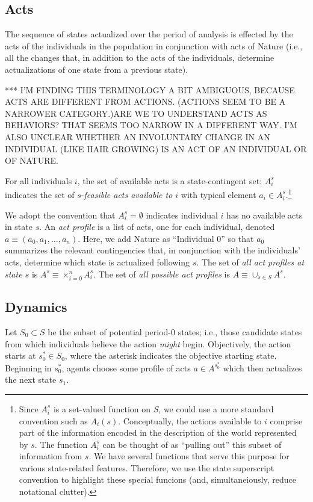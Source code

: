 \documentclass[
11pt,
titlepage,
reqno,
]{article}%
\theoremstyle{definition}
\begin{document}
	
	
	\subsection{Acts\label{sec:dynamics}}
	The sequence of states actualized over the period of analysis is effected by the acts of the individuals in the population in conjunction with acts of Nature (i.e., all the changes that, in addition to the acts of the individuals, determine actualizations of one state from a previous state). 
	
	*** I'M FINDING THIS TERMINOLOGY A BIT AMBIGUOUS, BECAUSE ACTS ARE DIFFERENT FROM ACTIONS. (ACTIONS SEEM TO BE A NARROWER CATEGORY.)ARE WE TO UNDERSTAND ACTS AS BEHAVIORS? THAT SEEMS TOO NARROW IN A DIFFERENT WAY. I'M ALSO UNCLEAR WHETHER AN INVOLUNTARY CHANGE IN AN INDIVIDUAL (LIKE HAIR GROWING) IS AN ACT OF AN INDIVIDUAL OR OF NATURE. 
	
	For all individuals $i$,  the set of available acts is a state-contingent set: $A_i^s$ indicates the set of $s$-\textit{feasible acts available to $i$} with typical element $a_i\in A_i^s$.\footnote
	{
		Since $A_i^s$ is a set-valued function on $S$, we could use a more standard convention such as $A_i(s)$.  
		Conceptually, the actions available to $i$ comprise part of the information encoded in the description of the world represented by $s$. 
		The function $A_i^s$ can be thought of as ``pulling out'' this subset of information from $s$. We have several functions that serve this purpose for various state-related features. 
		Therefore, we use the state superscript convention to highlight these special funcions (and, simultaneiously, reduce notational clutter).
	} 
	
	We adopt the convention that $A_i^s=\emptyset$ indicates individual $i$ has no available acts in state $s$.
	An \textit{act profile} is a list of acts, one for each individual, denoted  $a\equiv(a_0,a_1,\ldots,a_n)$. 
	Here, we add Nature as ``Individual 0'' so that $a_0$ summarizes the relevant contingencies that, in conjunction with the individuals' acts, determine which state is actualized following $s$. 
	The set of \textit{all act profiles at state $s$} is $A^s\equiv \times_{i=0}^n A_i^s$. The set of \textit{all possible act profiles} is $A\equiv \cup_{s\in S} A^s$.
	
	\subsection{Dynamics  } 
	Let $S_0\subset S$ be the subset of potential period-0 states; i.e., those candidate states from which individuals believe the action \textit{might} begin. 
	Objectively, the action starts at  $s_0^\ast\in S_0$, where the asterisk indicates the objective starting state.  
	Beginning in $s_0^\ast$, agents choose some profile of acts $a\in A^{s_0^\ast}$ which then actualizes the next state $s_1$. 
	
\end{document}
